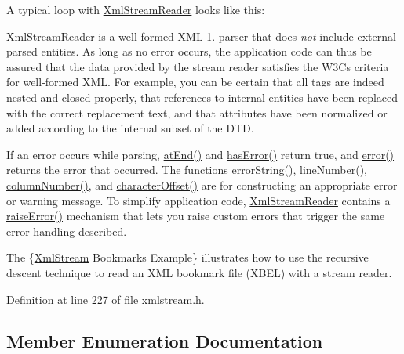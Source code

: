 A typical loop with \hyperlink{class_xml_stream_reader}{Xml\+Stream\+Reader} looks like this\+:


\begin{DoxyCodeInclude}
\end{DoxyCodeInclude}


\hyperlink{class_xml_stream_reader}{Xml\+Stream\+Reader} is a well-\/formed X\+ML 1. parser that does {\itshape not} include external parsed entities. As long as no error occurs, the application code can thus be assured that the data provided by the stream reader satisfies the W3C\textquotesingle{}s criteria for well-\/formed X\+ML. For example, you can be certain that all tags are indeed nested and closed properly, that references to internal entities have been replaced with the correct replacement text, and that attributes have been normalized or added according to the internal subset of the D\+TD.

If an error occurs while parsing, \hyperlink{class_xml_stream_reader_a4acf0ba0ea25300b66c9d85ba3e8dfb3}{at\+End()} and \hyperlink{class_xml_stream_reader_a26bc2d6831322e5a1d86182295f912d0}{has\+Error()} return true, and \hyperlink{class_xml_stream_reader_ae9a7e8fe9f15b0f5c4ec5fa080c6249f}{error()} returns the error that occurred. The functions \hyperlink{class_xml_stream_reader_a119d913daa2a7b8174f0b26dcd7e9720}{error\+String()}, \hyperlink{class_xml_stream_reader_a74a3827867942f9904924f2004c4177e}{line\+Number()}, \hyperlink{class_xml_stream_reader_a88724d9577a835b0e8d84ed945c306df}{column\+Number()}, and \hyperlink{class_xml_stream_reader_a08a187eb8969ddabf238e1f731bb754a}{character\+Offset()} are for constructing an appropriate error or warning message. To simplify application code, \hyperlink{class_xml_stream_reader}{Xml\+Stream\+Reader} contains a \hyperlink{class_xml_stream_reader_aae008ac9078fb7edb4a77ba3e76b8dfa}{raise\+Error()} mechanism that lets you raise custom errors that trigger the same error handling described.

The \{\hyperlink{class_xml_stream}{Xml\+Stream} Bookmarks Example\} illustrates how to use the recursive descent technique to read an X\+ML bookmark file (X\+B\+EL) with a stream reader.

Definition at line 227 of file xmlstream.\+h.



\subsection{Member Enumeration Documentation}
\mbox{\label{class_xml_stream_reader_ae7aa6749ae6e9de9bcb6f084a9884286}} 
